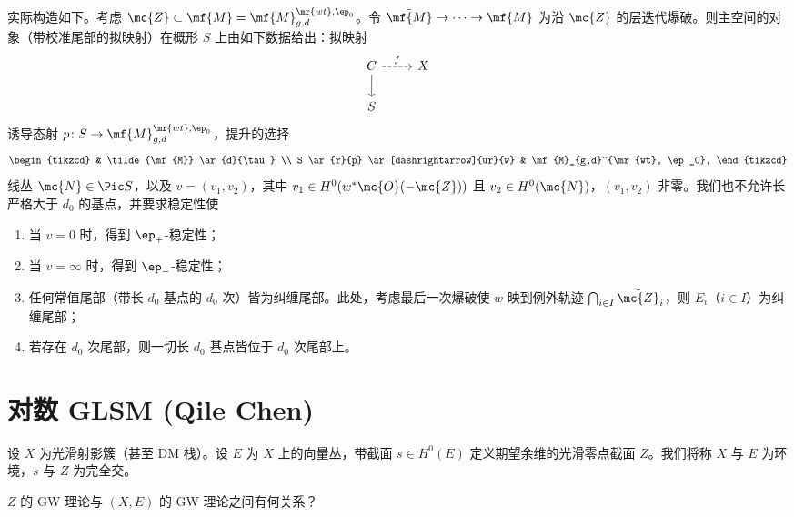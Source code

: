实际构造如下。考虑 \(\mc{Z} \subset \mf{M} = \mf{M}_{g,d}^{\mr{wt}, \ep_0}\)。令 \(\tilde{\mf{M}} \to \cdots \to \mf{M}\) 为沿 \(\mc{Z}\) 的层迭代爆破。则主空间的对象（带校准尾部的拟映射）在概形 \(S\) 上由如下数据给出：拟映射
\begin{equation*}
\begin{tikzcd}
    C \ar{d} \ar[dashrightarrow]{r}{f} & X \\
    S
\end{tikzcd}
\end{equation*}
诱导态射 \(p \colon S \to \mf{M}_{g,d}^{\mr{wt}, \ep_0}\)，提升的选择
\begin{equation*}
\begin{tikzcd}
    & \tilde{\mf{M}} \ar{d}{\tau} \\
    S \ar{r}{p} \ar[dashrightarrow]{ur}{w} & \mf{M}_{g,d}^{\mr{wt}, \ep_0},
\end{tikzcd}
\end{equation*}
线丛 \(\mc{N} \in \Pic S\)，以及 \(v = (v_1, v_2)\)，其中 \(v_1 \in H^0(w^* \mc{O}(-\mc{Z}))\) 且 \(v_2 \in H^0(\mc{N})\)，\((v_1, v_2)\) 非零。我们也不允许长严格大于 \(d_0\) 的基点，并要求稳定性使
\begin{enumerate}
    \item 当 \(v = 0\) 时，得到 \(\ep_+\)-稳定性；
    \item 当 \(v = \infty\) 时，得到 \(\ep_-\)-稳定性；
    \item 任何常值尾部（带长 \(d_0\) 基点的 \(d_0\) 次）皆为纠缠尾部。此处，考虑最后一次爆破使 \(w\) 映到例外轨迹 \(\bigcap_{i \in I} \tilde{\mc{Z}}_i\)，则 \(E_i\)（\(i \in I\)）为纠缠尾部；
    \item 若存在 \(d_0\) 次尾部，则一切长 \(d_0\) 基点皆位于 \(d_0\) 次尾部上。
\end{enumerate}







\section{对数 GLSM (Qile Chen)}%
\label{sec:Log GLSM (Qile Chen)}

设 \(X\) 为光滑射影簇（甚至 DM 栈）。设 \(E\) 为 \(X\) 上的向量丛，带截面 \(s \in H^0(E)\) 定义期望余维的光滑零点截面 \(Z\)。我们将称 \(X\) 与 \(E\) 为环境，\(s\) 与 \(Z\) 为完全交。

\begin{quest}
    \(Z\) 的 GW 理论与 \((X, E)\) 的 GW 理论之间有何关系？
\end{quest}


